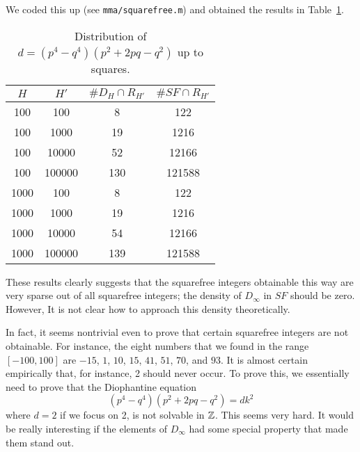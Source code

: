 We coded this up (see \texttt{mma/squarefree.m}) and obtained the
results in Table~\ref{tab:squarefree}.

\begin{table}[hbtp]
  \centering
  \begin{tabular}{| c | c | c | c |}
    \hline
    $H$ & $H'$ & $\# D_H \cap R_{H'}$ & $\# SF \cap R_{H'}$ \\ \hline
    100 & 100 & 8 & 122 \\ \hline
    100 & 1000 & 19 & 1216 \\ \hline
    100 & 10000 & 52 & 12166 \\ \hline
    100 & 100000 & 130 & 121588 \\ \hline
    1000 & 100 & 8 & 122 \\ \hline
    1000 & 1000 & 19 & 1216 \\ \hline
    1000 & 10000 & 54 & 12166 \\ \hline
    1000 & 100000 & 139 & 121588 \\ \hline
  \end{tabular}
  \caption{Distribution of $d = (p^4 - q^4)(p^2 + 2pq - q^2)$ up to
    squares.}
  \label{tab:squarefree}
\end{table}

These results clearly suggests that the squarefree integers obtainable
this way are very sparse out of all squarefree integers; the density
of $D_\infty$ in $SF$ should be zero. However, It is not clear how to
approach this density theoretically.

In fact, it seems nontrivial even to prove that certain squarefree
integers are not obtainable. For instance, the eight numbers that we
found in the range $[-100, 100]$ are $-15$, $1$, $10$, $15$, $41$,
$51$, $70$, and $93$. It is almost certain empirically that, for
instance, 2 should never occur. To prove this, we essentially need to
prove that the Diophantine equation
\[
(p^4 - q^4)(p^2 + 2pq - q^2) = d k^2
\]
where $d = 2$ if we focus on 2, is not solvable in $\mathbb{Z}$. This seems
very hard. It would be really interesting if the elements of
$D_\infty$ had some special property that made them stand out.

